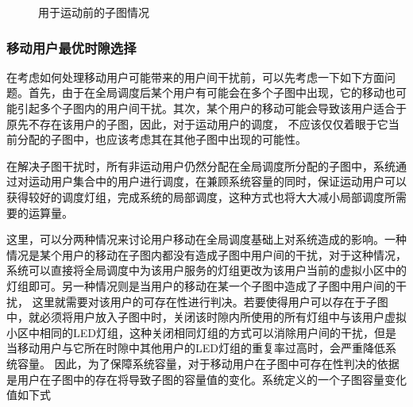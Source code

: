 \begin{figure}[htbp]
    \centering
    \caption{用于运动前的子图情况}
    \label{fig:slot-after-user-move}
\end{figure}

\subsubsection{移动用户最优时隙选择}
在考虑如何处理移动用户可能带来的用户间干扰前，可以先考虑一下如下方面问题。首先，由于在全局调度后某个用户有可能会在多个子图中出现，它的移动也可能引起多个子图内的用户间干扰。其次，某个用户的移动可能会导致该用户适合于原先不存在该用户的子图，因此，对于运动用户的调度，
不应该仅仅着眼于它当前分配的子图中，也应该考虑其在其他子图中出现的可能性。

在解决子图干扰时，所有非运动用户仍然分配在全局调度所分配的子图中，系统通过对运动用户集合中的用户进行调度，在兼顾系统容量的同时，保证运动用户可以获得较好的调度灯组，完成系统的局部调度，这种方式也将大大减小局部调度所需要的运算量。

这里，可以分两种情况来讨论用户移动在全局调度基础上对系统造成的影响。一种情况是某个用户的移动在子图内都没有造成子图中用户间的干扰，对于这种情况，系统可以直接将全局调度中为该用户服务的灯组更改为该用户当前的虚拟小区中的灯组即可。另一种情况则是当用户的移动在某一个子图中造成了子图中用户间的干扰，
这里就需要对该用户的可存在性进行判决。若要使得用户可以存在于子图中，就必须将用户放入子图中时，关闭该时隙内所使用的所有灯组中与该用户虚拟小区中相同的LED灯组，这种关闭相同灯组的方式可以消除用户间的干扰，但是当移动用户与它所在时隙中其他用户的LED灯组的重复率过高时，会严重降低系统容量。
因此，为了保障系统容量，对于移动用户在子图中可存在性判决的依据是用户在子图中的存在将导致子图的容量值的变化。系统定义的一个子图容量变化值如下式

